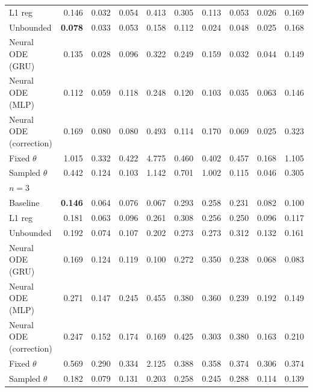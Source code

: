 \begin{tabular}{lrrrrrrrrr}
L1 reg & 0.146 & 0.032 & 0.054 & 0.413 & 0.305 & 0.113 & 0.053 & 0.026 & 0.169 \\
Unbounded & \textbf{0.078} & 0.033 & 0.053 & 0.158 & 0.112 & 0.024 & 0.048 & 0.025 & 0.168 \\
Neural ODE (GRU) & 0.135 & 0.028 & 0.096 & 0.322 & 0.249 & 0.159 & 0.032 & 0.044 & 0.149 \\
Neural ODE (MLP) & 0.112 & 0.059 & 0.118 & 0.248 & 0.120 & 0.103 & 0.035 & 0.063 & 0.146 \\
Neural ODE (correction) & 0.169 & 0.080 & 0.080 & 0.493 & 0.114 & 0.170 & 0.069 & 0.025 & 0.323 \\
Fixed $\theta$ & 1.015 & 0.332 & 0.422 & 4.775 & 0.460 & 0.402 & 0.457 & 0.168 & 1.105 \\
Sampled $\theta$ & 0.442 & 0.124 & 0.103 & 1.142 & 0.701 & 1.002 & 0.115 & 0.046 & 0.305 \\
\midrule
\multicolumn{10}{l}{\textbf{$n=3$}} \\
Baseline & \textbf{0.146} & 0.064 & 0.076 & 0.067 & 0.293 & 0.258 & 0.231 & 0.082 & 0.100 \\
L1 reg & 0.181 & 0.063 & 0.096 & 0.261 & 0.308 & 0.256 & 0.250 & 0.096 & 0.117 \\
Unbounded & 0.192 & 0.074 & 0.107 & 0.202 & 0.273 & 0.273 & 0.312 & 0.132 & 0.161 \\
Neural ODE (GRU) & 0.169 & 0.124 & 0.119 & 0.100 & 0.272 & 0.350 & 0.238 & 0.068 & 0.083 \\
Neural ODE (MLP) & 0.271 & 0.147 & 0.245 & 0.455 & 0.380 & 0.360 & 0.239 & 0.192 & 0.149 \\
Neural ODE (correction) & 0.247 & 0.152 & 0.174 & 0.169 & 0.425 & 0.303 & 0.380 & 0.163 & 0.210 \\
Fixed $\theta$ & 0.569 & 0.290 & 0.334 & 2.125 & 0.388 & 0.358 & 0.374 & 0.306 & 0.374 \\
Sampled $\theta$ & 0.182 & 0.079 & 0.131 & 0.203 & 0.258 & 0.245 & 0.288 & 0.114 & 0.139 \\
\bottomrule
\end{tabular}

